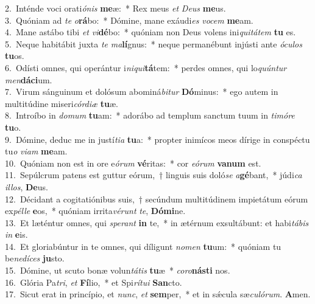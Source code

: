 {2.~}Inténde voci orati\textit{ó}\textit{nis} \textbf{me}æ:~* Rex meus \textit{et} \textit{De}\textit{us} \textbf{me}us.\\
{3.~}Quóniam ad \textit{te} \textit{o}\textbf{rá}bo:~* Dómine, mane exáudi\textit{es} \textit{vo}\textit{cem} \textbf{me}am.\\
{4.~}Mane astábo tibi \textit{et} \textit{vi}\textbf{dé}bo:~* quóniam non Deus volens ini\textit{qui}\textit{tá}\textit{tem} \textbf{tu} es.\\
{5.~}Neque habitábit juxta \textit{te} \textit{ma}\textbf{lí}gnus:~* neque permanébunt injústi ante \textit{ó}\textit{cu}\textit{los} \textbf{tu}os.\\
{6.~}Odísti omnes, qui operántur i\textit{ni}\textit{qui}\textbf{tá}tem:~* perdes omnes, qui lo\textit{quún}\textit{tur} \textit{men}\textbf{dá}\textbf{ci}um.\\
{7.~}Virum sánguinum et dolósum abominá\textit{bi}\textit{tur} \textbf{Dó}minus:~* ego autem in multitúdine miseri\textit{cór}\textit{di}\textit{æ} \textbf{tu}æ.\\
{8.~}Introíbo in \textit{do}\textit{mum} \textbf{tu}am:~* adorábo ad templum sanctum tuum in \textit{ti}\textit{mó}\textit{re} \textbf{tu}o.\\
{9.~}Dómine, deduc me in justí\textit{ti}\textit{a} \textbf{tu}a:~* propter inimícos meos dírige in conspéctu tu\textit{o} \textit{vi}\textit{am} \textbf{me}am.\\
{10.~}Quóniam non est in ore e\textit{ó}\textit{rum} \textbf{vé}ritas:~* cor \textit{e}\textit{ó}\textit{rum} \textbf{va}\textbf{num} est.\\
{11.~}Sepúlcrum patens est guttur eórum,~† linguis suis doló\textit{se} \textit{a}\textbf{gé}bant,~* júdi\textit{ca} \textit{il}\textit{los}, \textbf{De}us.\\
{12.~}Décidant a cogitatiónibus suis,~† secúndum multitúdinem impietátum eórum ex\textit{pél}\textit{le} \textbf{e}os,~* quóniam irrita\textit{vé}\textit{runt} \textit{te}, \textbf{Dó}\textbf{mi}ne.\\
{13.~}Et læténtur omnes, qui \textit{spe}\textit{rant} \textbf{in} te,~* in ætérnum exsultábunt: et habi\textit{tá}\textit{bis} \textit{in} \textbf{e}is.\\
{14.~}Et gloriabúntur in te omnes, qui díligunt \textit{no}\textit{men} \textbf{tu}um:~* quóniam tu be\textit{ne}\textit{dí}\textit{ces} \textbf{ju}sto.\\
{15.~}Dómine, ut scuto bonæ volun\textit{tá}\textit{tis} \textbf{tu}æ~* \textit{co}\textit{ro}\textbf{ná}\textbf{sti} nos.\\
{16.~}Glória Pa\textit{tri}, \textit{et} \textbf{Fí}lio,~* et Spi\textit{rí}\textit{tu}\textit{i} \textbf{San}cto.\\
{17.~}Sicut erat in princípio, et \textit{nunc}, \textit{et} \textbf{sem}per,~* et in sǽcula sæ\textit{cu}\textit{ló}\textit{rum}. \textbf{A}men.\\
